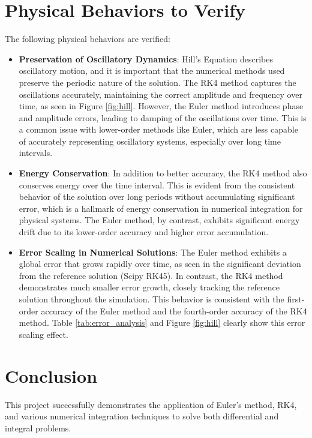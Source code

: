\documentclass[twocolumn, 11pt]{article}
\begin{document}
\section{Physical Behaviors to Verify}
The following physical behaviors are verified:

\begin{itemize}
     \item \textbf{Preservation of Oscillatory Dynamics}: Hill's Equation describes oscillatory motion, and it is important that the numerical methods used preserve the periodic nature of the solution. The RK4 method captures the oscillations accurately, maintaining the correct amplitude and frequency over time, as seen in Figure \ref{fig:hill}. However, the Euler method introduces phase and amplitude errors, leading to damping of the oscillations over time. This is a common issue with lower-order methods like Euler, which are less capable of accurately representing oscillatory systems, especially over long time intervals.
    
    \item \textbf{Energy Conservation}: In addition to better accuracy, the RK4 method also conserves energy over the time interval. This is evident from the consistent behavior of the solution over long periods without accumulating significant error, which is a hallmark of energy conservation in numerical integration for physical systems. The Euler method, by contrast, exhibits significant energy drift due to its lower-order accuracy and higher error accumulation.

    \item \textbf{Error Scaling in Numerical Solutions}: The Euler method exhibits a global error that grows rapidly over time, as seen in the significant deviation from the reference solution (Scipy RK45). In contrast, the RK4 method demonstrates much smaller error growth, closely tracking the reference solution throughout the simulation. This behavior is consistent with the first-order accuracy of the Euler method and the fourth-order accuracy of the RK4 method. Table \ref{tab:error_analysis} and Figure \ref{fig:hill} clearly show this error scaling effect.
\end{itemize}


\section{Conclusion}
This project successfully demonstrates the application of Euler's method, RK4, and various numerical integration techniques to solve both differential and integral problems. 
\end{document}
